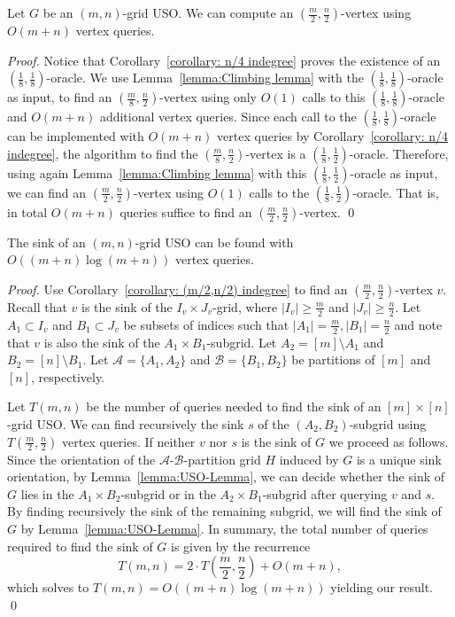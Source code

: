 \documentclass[runningheads,a4paper]{llncs}
\newcommand{\A}{\ensuremath{\mathcal A}}
\newcommand{\B}{\ensuremath{\mathcal B}}
\begin{document}
\begin{corollary}
Let $G$ be an $(m,n)$-grid USO. 
We can compute an $( \frac{m}{2}, \frac{n}{2})$-vertex using $O(m + n)$ vertex queries.
\end{corollary}
\begin{proof}
Notice that Corollary~\ref{corollary: n/4 indegree} proves the existence of an $( \frac{1}{8}, \frac{1}{8})$-oracle.
We use Lemma~\ref{lemma:Climbing lemma} with the $(\frac{1}{8}, \frac{1}{8})$-oracle as input, to find an $(\frac{m}{8}, \frac{n}{2})$-vertex using only $O(1)$ calls to this $(\frac{1}{8}, \frac{1}{8})$-oracle and $O(m+n)$ additional vertex queries. Since each call to the  $(\frac{1}{8}, \frac{1}{8})$-oracle can be implemented with $O(m+n)$ vertex queries by Corollary~\ref{corollary: n/4 indegree}, the algorithm to find the $(\frac{m}{8}, \frac{n}{2})$-vertex is a $(\frac{1}{8}, \frac{1}{2})$-oracle. 
Therefore, using again Lemma~\ref{lemma:Climbing lemma} with this $(\frac{1}{8}, \frac{1}{2})$-oracle as input, we can find an $(\frac{m}{2}, \frac{n}{2})$-vertex using $O(1)$ calls to the $(\frac{1}{8}, \frac{1}{2})$-oracle. That is, in total $O(m + n)$ queries suffice to find an $(\frac{m}{2}, \frac{n}{2})$-vertex. \qed
\end{proof}

\setcounter{theorem}{0}
\begin{theorem}
The sink of an $(m,n)$-grid USO can be found with \\ $O((m+n)\log (m+n))$ vertex queries.
\end{theorem}

\begin{proof}
Use Corollary~\ref{corollary: (m/2,n/2) indegree} to find an $(\frac{m}{2}, \frac{n}{2})$-vertex $v$. 
Recall that $v$ is the sink of the $I_v\times J_v$-grid, where $|I_v| \geq \frac{m}{2}$ and $|J_v|\geq \frac{n}{2}$. Let $A_1\subset I_v$ and $B_1\subset J_v$ be subsets of indices such that $|A_1| = \frac{m}{2}, |B_1| = \frac{n}{2}$ and note that $v$ is also the sink of the $A_1\times B_1$-subgrid.
Let $A_2= [m]\setminus A_1$ and $B_2 = [n]\setminus B_1$.
Let $\A = \{A_1, A_2\}$ and $\B = \{B_1, B_2\}$ be partitions of $[m]$ and $[n]$, respectively.

Let $T(m, n)$ be the number of queries needed to find the sink of an $[m]\times[n]$-grid USO.
We can find recursively the sink $s$ of the $(A_2, B_2)$-subgrid using $T(\frac{m}{2}, \frac{n}{2})$ vertex queries. 
If neither $v$ nor $s$ is the sink of $G$ we proceed as follows.
Since the orientation of the $\A$-$\B$-partition grid $H$ induced by $G$ is a unique sink orientation, by Lemma~\ref{lemma:USO-Lemma}, we can decide whether the sink of $G$ lies in the $A_1\times B_2$-subgrid or in the $A_2\times B_1$-subgrid after querying $v$ and $s$.
By finding recursively the sink of the remaining subgrid, we will find the sink of $G$ by Lemma~\ref{lemma:USO-Lemma}. In summary, the total number of queries required to find the sink of $G$ is given by the recurrence
$$T(m, n) = 2\cdot T\left(\frac{m}{2}, \frac{n}{2}\right) + O(m+n),$$
which solves to $T(m, n) = O((m+n) \log (m+n))$ yielding our result. \qed
\end{proof}
\end{document}
